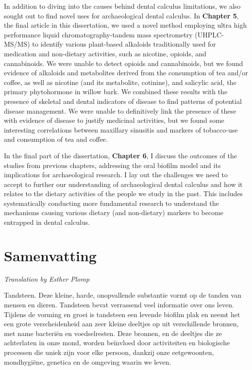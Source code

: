 \documentclass[
  b5paper,
]{book}
\begin{document}
In addition to diving into the causes behind dental calculus
limitations, we also sought out to find novel uses for archaeological
dental calculus. In \textbf{Chapter 5}, the final article in this
dissertation, we used a novel method employing ultra high performance
liquid chromatography-tandem mass spectrometry (UHPLC-MS/MS) to identify
various plant-based alkaloids traditionally used for medication and
non-dietary activities, such as nicotine, opioids, and cannabinoids. We
were unable to detect opioids and cannabinoids, but we found evidence of
alkaloids and metabolites derived from the consumption of tea and/or
coffee, as well as nicotine (and its metabolite, cotinine), and
salicylic acid, the primary phytohormone in willow bark. We combined
these results with the presence of skeletal and dental indicators of
disease to find patterns of potential disease management. We were unable
to definitively link the presence of these with evidence of disease to
justify medicinal activities, but we found some interesting correlations
between maxillary sinusitis and markers of tobacco-use and consumption
of tea and coffee.

In the final part of the dissertation, \textbf{Chapter 6}, I discuss the
outcomes of the studies from previous chapters, addressing the oral
biofilm model and its implications for archaeological research. I lay
out the challenges we need to accept to further our understanding of
archaeological dental calculus and how it relates to the dietary
activities of the people we study in the past. This includes
systematically conducting more fundamental research to understand the
mechanisms causing various dietary (and non-dietary) markers to become
entrapped in dental calculus.

\hypertarget{samenvatting}{%
\chapter*{Samenvatting}\label{samenvatting}}


\emph{Translation by Esther Plomp}

Tandsteen. Deze kleine, harde, onopvallende substantie vormt op de
tanden van mensen en dieren. Tandsteen bevat verrassend veel informatie
over ons leven. Tijdens de vorming en groei is tandsteen een levende
biofilm plak en neemt het een grote verscheidenheid aan zeer kleine
deeltjes op uit verschillende bronnen, met name bacteriën en
voedselresten. Deze bronnen, en de deeltjes die ze achterlaten in onze
mond, worden beïnvloed door activiteiten en biologische processen die
uniek zijn voor elke persoon, dankzij onze eetgewoonten, mondhygiëne,
genetica en de omgeving waarin we leven.
\end{document}
